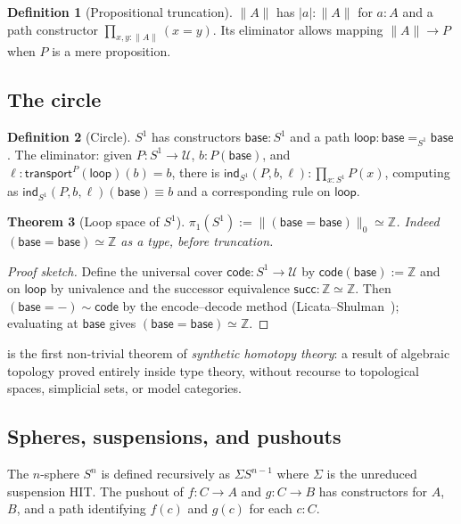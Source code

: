 \documentclass[12pt]{article}
\newtheorem{theorem}{Theorem}[section]
\theoremstyle{definition}
\newtheorem{definition}[theorem]{Definition}
\theoremstyle{remark}
\newcommand{\U}{\mathcal{U}}
\newcommand{\Z}{\mathbb{Z}}
\newcommand{\transport}{\mathsf{transport}}
\newcommand{\eqv}{\simeq}
\newcommand{\looppath}{\mathsf{loop}}
\newcommand{\base}{\mathsf{base}}
\newcommand{\Sone}{S^1}
\begin{document}
\begin{definition}[Propositional truncation]
\label{def:trunc}
$\|A\|$ has $|a| : \|A\|$ for $a : A$ and a path constructor
$\prod_{x, y : \|A\|}(x = y)$. Its eliminator allows mapping $\|A\| \to P$
when $P$ is a mere proposition.
\end{definition}

\subsection{The circle}

\begin{definition}[Circle]
\label{def:circle}
$\Sone$ has constructors $\base : \Sone$ and a path
$\looppath : \base =_{\Sone} \base$. The eliminator: given $P : \Sone \to \U$,
$b : P(\base)$, and $\ell : \transport^P(\looppath)(b) = b$, there is
$\mathsf{ind}_{\Sone}(P, b, \ell) : \prod_{x : \Sone} P(x)$, computing as
$\mathsf{ind}_{\Sone}(P, b, \ell)(\base) \equiv b$ and a corresponding rule
on $\looppath$.
\end{definition}

\begin{theorem}[Loop space of \texorpdfstring{$\Sone{}$}{S\^{}1}]
\label{thm:pi1}
$\pi_1(\Sone) := \|(\base = \base)\|_0 \eqv \Z$.
Indeed $(\base = \base) \eqv \Z$ as a type, before truncation.
\end{theorem}

\begin{proof}[Proof sketch]
Define the universal cover
$\mathsf{code} : \Sone \to \U$ by $\mathsf{code}(\base) := \Z$ and on
$\looppath$ by univalence and the successor equivalence
$\mathsf{succ} : \Z \eqv \Z$. Then
$(\base = -) \sim \mathsf{code}$ by the encode--decode method
(Licata--Shulman~\cite{LicataShulman}); evaluating at $\base$ gives
$(\base = \base) \eqv \Z$.
\end{proof}

 is the first non-trivial theorem of \emph{synthetic homotopy
theory}: a result of algebraic topology proved entirely inside type theory,
without recourse to topological spaces, simplicial sets, or model
categories.

\subsection{Spheres, suspensions, and pushouts}

The $n$-sphere $S^n$ is defined recursively as $\Sigma S^{n-1}$ where
$\Sigma$ is the unreduced suspension HIT\@. The pushout of
$f : C \to A$ and $g : C \to B$ has constructors for $A$, $B$, and a path
identifying $f(c)$ and $g(c)$ for each $c : C$.
\end{document}

